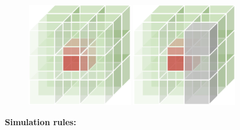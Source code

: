 \documentclass{mcmthesis}
\begin{document}
\begin{figure}[H]
  \centering
  {
  \includegraphics[width=0.4\textwidth]{image/I.png} 
  }
  {
  \includegraphics[width=0.4\textwidth]{image/J.png}
  }
  
  \label{png1}
\end{figure}


\textbf{Simulation rules:}
\end{document}
